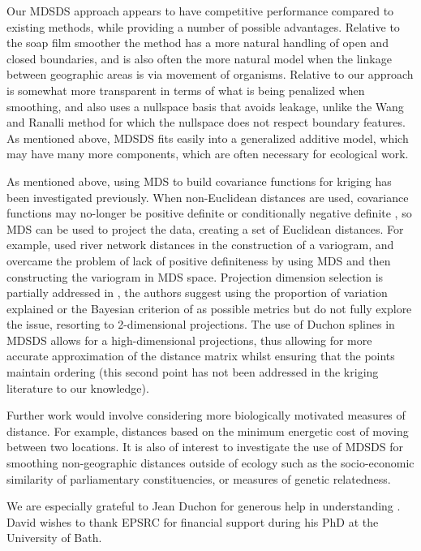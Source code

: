 \documentclass[smallextended]{svjour3}       %
\begin{document}
Our MDSDS approach appears to have competitive performance compared to existing methods, while providing a number of possible advantages. Relative to the soap film smoother the method has a more natural handling of open and closed boundaries, and is also often the more natural model when the linkage between geographic areas is via movement of organisms. Relative to \cite{Wang:2007tf} our approach is somewhat more transparent in terms of what is being penalized when smoothing, and also uses a nullspace basis that avoids leakage, unlike the Wang and Ranalli method for which the nullspace does not respect boundary features. As mentioned above, MDSDS fits easily into a generalized additive model, which may have many more components, which are often necessary for ecological work.

As mentioned above, using MDS to build covariance functions for kriging has been investigated previously. When non-Euclidean distances are used, covariance functions may no-longer be positive definite or conditionally negative definite \citep{Curriero:2005ww}, so MDS can be used to project the data, creating a set of Euclidean distances. For example, \cite{Loland:2003tp} used river network distances in the construction of a variogram, and overcame the problem of lack of positive definiteness by using MDS and then constructing the variogram in MDS space. Projection dimension selection is partially addressed in \cite{Jensen:2006kn}, the authors suggest using the proportion of variation explained or the Bayesian criterion of \cite{Oh:2011ve} as possible metrics but do not fully explore the issue, resorting to 2-dimensional projections. The use of Duchon splines in MDSDS allows for a high-dimensional projections, thus allowing for more accurate approximation of the distance matrix whilst ensuring that the points maintain ordering (this second point has not been addressed in the kriging literature to our knowledge).

Further work would involve considering more biologically motivated measures of distance. For example, distances based on the minimum energetic cost of moving between  two locations. It is also of interest to investigate the use of MDSDS for smoothing non-geographic distances outside of ecology such as the socio-economic similarity of parliamentary constituencies, or measures of genetic relatedness.

\begin{acknowledgements}
We are especially grateful to Jean Duchon for generous help in understanding \cite{Duchon:1977tr}. David wishes to thank EPSRC for financial support during his PhD at the University of Bath.
\end{acknowledgements}

\end{document}
